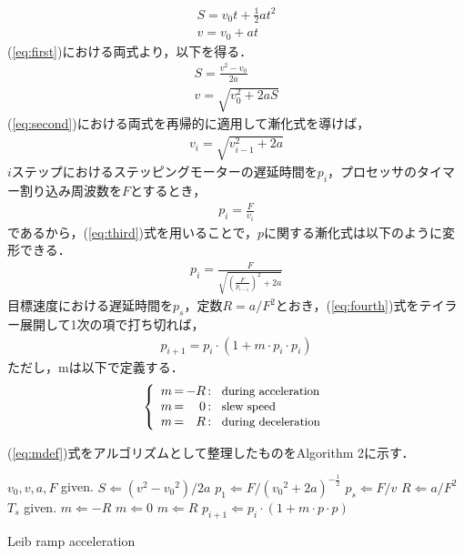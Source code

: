 \documentclass[twocolumn,oneside,a4paper]{article}
\begin{document}
\begin{eqnarray}\label{eq:first}
     S = v_0 t + \frac{1}{2} a t^2 \nonumber \\
     v = v_0 + a t    
\end{eqnarray}
(\ref{eq:first})における両式より，以下を得る．
\begin{eqnarray}\label{eq:second}
     S = \frac{v^2-v_0}{2 a} \nonumber \\
     v = \sqrt{v_0^2+2aS}
\end{eqnarray}
(\ref{eq:second})における両式を再帰的に適用して漸化式を導けば，
\begin{eqnarray}\label{eq:third}
     v_i = \sqrt{v_{i-1}^2 + 2a}
\end{eqnarray}
$i$ステップにおけるステッピングモーターの遅延時間を$p_i$，プロセッサのタイマー割り込み周波数を$F$とするとき，
\begin{eqnarray*}
     p_i = \frac{F}{v_i}
\end{eqnarray*}
であるから，(\ref{eq:third})式を用いることで，$p$に関する漸化式は以下のように変形できる．
\begin{eqnarray}\label{eq:fourth}
     p_i = \frac{F}{\sqrt{{(\frac{F}{p_{i-1}})}^2+2a}}
\end{eqnarray}
目標速度における遅延時間を$p_s$，定数$R= a/F^2$とおき，(\ref{eq:fourth})式をテイラー展開して1次の項で打ち切れば，
\begin{eqnarray}\label{eq:pupdate}
     p_{i+1} = p_i \cdot (1 + m \cdot p_i \cdot p_i)
\end{eqnarray}
ただし，mは以下で定義する．
\begin{eqnarray}\label{eq:mdef}
\left\{
\begin{array}{r@{\,}c@{\,}r@{\,}c@{\,}l@{\;\;}r}
 m &=& -R &:& \:\:\: \mbox{\small during acceleration}\\
 m &=& 0 &:&  \:\:\: \mbox{\small slew speed}\\
 m &=& R &:&  \:\:\: \mbox{\small during deceleration}
\end{array}%
\right.
\end{eqnarray}

(\ref{eq:mdef})式をアルゴリズムとして整理したものをAlgorithm 2に示す．

\begin{algorithm}        
\begin{algorithmic}                 
\STATE $v_0, v, a, F$ given.
\STATE $S \Leftarrow (v^2-{v_0}^2) / 2 a$
\STATE $p_1 \Leftarrow F / ({v_0}^2 + 2a)^{-\frac{1}{2}}$
\STATE $p_s \Leftarrow F/v$
\STATE $R \Leftarrow a / F^2$
\STATE $T_s$ given.
  \STATE $m \Leftarrow -R$
  \STATE $m \Leftarrow 0$
\ELSE
  \STATE $m \Leftarrow R$
\ENDIF
\STATE $p_{i+1} \Leftarrow p_i \cdot (1+m\cdot p \cdot p)$
\ENDFOR
\end{algorithmic}
\caption{Leib ramp acceleration}
\label{fig:leib_algorithm}                         

\end{algorithm}
\end{document}
